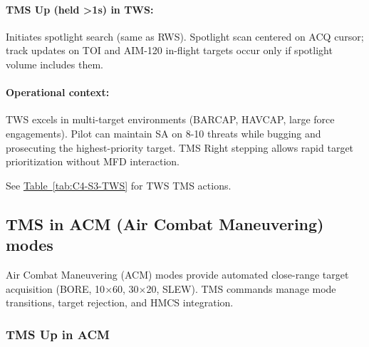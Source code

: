 \documentclass[11pt, a4paper, twoside]{report}
\newcommand{\tabref}[1]{\hyperref[#1]{Table~\ref*{#1}}}
\begin{document}
\paragraph{TMS Up (held >1s) in TWS:}
Initiates spotlight search (same as RWS). Spotlight scan centered on ACQ cursor; track updates on TOI and AIM-120 in-flight targets occur only if spotlight volume includes them.

\paragraph{Operational context:}
TWS excels in multi-target environments (BARCAP, HAVCAP, large force engagements). Pilot can maintain SA on 8-10 threats while bugging and prosecuting the highest-priority target. TMS Right stepping allows rapid target prioritization without MFD interaction.

See \tabref{tab:C4-S3-TWS} for TWS TMS actions.

\subsection{TMS in ACM (Air Combat Maneuvering) modes}
\label{sec:C4-S3-S4}

Air Combat Maneuvering (ACM) modes provide automated close-range target 
acquisition (BORE, 10$\times$60, 30$\times$20, SLEW). TMS commands manage 
mode transitions, target rejection, and HMCS integration.

\subsubsection*{TMS Up in ACM}
\label{sec:C4-S3-S4-S1}
\end{document}
